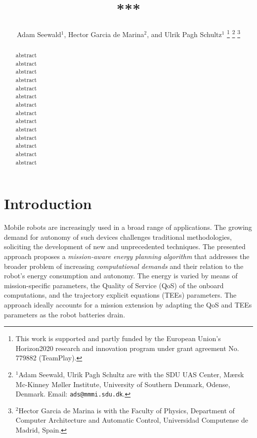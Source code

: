 \documentclass[letterpaper,10pt,conference]{ieeeconf}
\title{\LARGE \bf
***
}
\author{
  Adam Seewald$^{1}$, Hector Garcia de Marina$^{2}$, and Ulrik Pagh Schultz$^{1}$
  \thanks{This work is supported and partly funded by the European Union's Horizon2020 research and innovation program under grant agreement No. 779882 (TeamPlay).
  }
  \thanks{$^{1}$Adam Seewald, Ulrik Pagh Schultz are with the SDU UAS Center, M{\ae}rsk Mc-Kinney M{\o}ller Institute, University of Southern Denmark, Odense, Denmark. Email: {\tt\small ads@mmmi.sdu.dk}.}
  \thanks{$^{2}$Hector Garcia de Marina is with the Faculty of Physics, Department of Computer Architecture and Automatic Control, Universidad Computense de Madrid, Spain.}
}
\begin{document}
\maketitle

\thispagestyle{empty}
\pagestyle{empty}

\begin{abstract}

  abstract\\
  abstract\\
  abstract\\
  abstract\\
  abstract\\
  abstract\\
  abstract\\
  abstract\\
  abstract\\
  abstract\\
  abstract\\
  abstract\\
  abstract\\
  abstract
\end{abstract}

%
\IEEEpeerreviewmaketitle

\section{Introduction}
\label{sec:intro}


Mobile robots are increasingly used in a broad range of applications. The growing demand for autonomy of such devices challenges traditional methodologies, soliciting the development of new and unprecedented techniques. The presented approach proposes a \emph{mission-aware energy planning algorithm} that addresses the broader problem of increasing \emph{computational demands} and their relation to the robot's energy consumption and autonomy. The energy is varied by means of mission-specific parameters, the Quality of Service (QoS) of the onboard computations, and the trajectory explicit equations (TEEs) parameters. The approach ideally accounts for a mission extension by adapting the QoS and TEEs parameters as the robot batteries drain.
\end{document}

